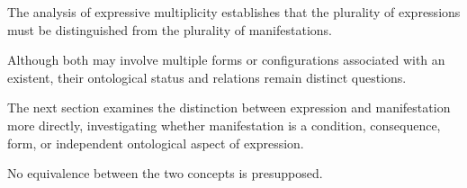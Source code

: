 The analysis of expressive multiplicity
establishes that the plurality of expressions
must be distinguished from the plurality
of manifestations.

Although both may involve multiple forms
or configurations associated with an existent,
their ontological status and relations
remain distinct questions.

The next section examines the distinction
between expression and manifestation more
directly, investigating whether manifestation
is a condition, consequence, form, or
independent ontological aspect of expression.

No equivalence between the two concepts
is presupposed.


